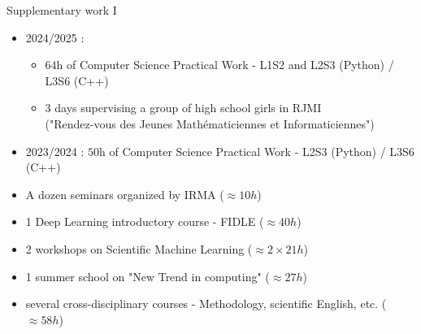 \begin{frame}{Supplementary work I}
	\small
	\vspace{-10pt}
	\begin{tcolorbox}[
		skin=bicolor,
		colback=other, %
		colbacklower=other!20!white,
		title={Teaching},
		colframe=title, %
		arc=2mm, %
		boxrule=0.5pt, %
		breakable, enhanced jigsaw,
		width=\linewidth,
		opacityback=0.1,
		]

		\begin{itemize}[\textcolor{other}{$\blacktriangleright$}]
			\item 2024/2025 :
			\begin{itemize}[\textcolor{other}{$\blacktriangleright$}]
                \item $64$h of Computer Science Practical Work - L1S2 and L2S3 (Python) / L3S6 (C++)
                \item $3$ days supervising a group of high school girls in RJMI \\
                ("Rendez-vous des Jeunes Mathématiciennes et Informaticiennes")
            \end{itemize}
            \item 2023/2024 : $50$h of Computer Science Practical Work - L2S3 (Python) / L3S6 (C++)
		\end{itemize}
	\end{tcolorbox}

    \vspace{-7pt}
	\begin{tcolorbox}[
		skin=bicolor,
		colback=other, %
		colbacklower=other!20!white,
		title={Training courses (Total : $176$h$35$)},
		colframe=title, %
		arc=2mm, %
		boxrule=0.5pt, %
		breakable, enhanced jigsaw,
		width=\linewidth,
		opacityback=0.1
		]
		
		\begin{itemize}[\textcolor{other}{$\blacktriangleright$}]
			\item A dozen seminars organized by IRMA ($\approx 10h$)
            \item 1 Deep Learning introductory course - FIDLE ($\approx 40h$)
            \item 2 workshops on Scientific Machine Learning ($\approx 2\times 21h$)
            \item 1 summer school on "New Trend in computing" ($\approx 27h$)
            \item several cross-disciplinary courses - Methodology, scientific English, etc. ($\approx 58h$)
		\end{itemize} 
	\end{tcolorbox}
\end{frame}

